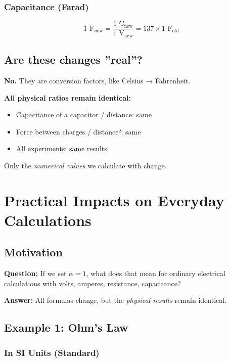 	\subsubsection{Capacitance (Farad)}
	
	\begin{equation}
		1 \text{ F}_{\text{new}} = \frac{1 \text{ C}_{\text{new}}}{1 \text{ V}_{\text{new}}} = 137 \times 1 \text{ F}_{\text{old}}
	\end{equation}
	
	\subsection{Are these changes ''real''?}
	
	\textbf{No.} They are conversion factors, like Celsius → Fahrenheit.
	
	\textbf{All physical ratios remain identical:}
	\begin{itemize}
		\item Capacitance of a capacitor / distance: same
		\item Force between charges / distance²: same
		\item All experiments: same results
	\end{itemize}
	
	Only the \textit{numerical values} we calculate with change.
	
	\section{Practical Impacts on Everyday Calculations}
	\label{sec:practical_calculations}
	
	\subsection{Motivation}
	
	\textbf{Question:} If we set $\alpha = 1$, what does that mean for ordinary electrical calculations with volts, amperes, resistance, capacitance?
	
	\textbf{Answer:} All formulas change, but the \textit{physical results} remain identical.
	
	\subsection{Example 1: Ohm's Law}
	
	\subsubsection{In SI Units (Standard)}
	
